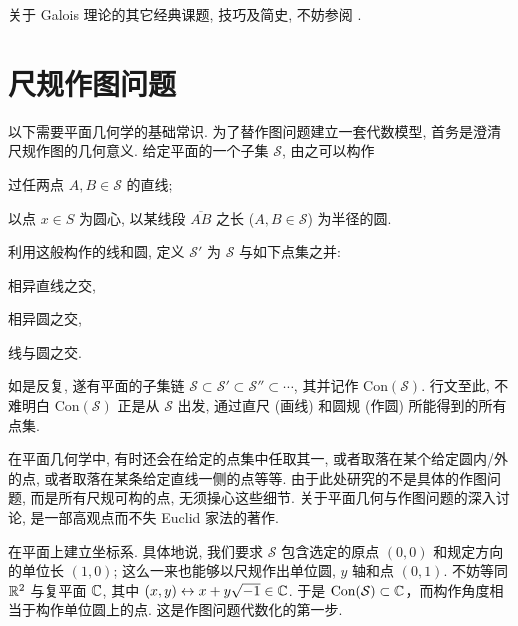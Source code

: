 关于 Galois 理论的其它经典课题, 技巧及简史, 不妨参阅 \cite{ZhP}.

\section{尺规作图问题}
以下需要平面几何学的基础常识. 为了替作图问题建立一套代数模型, 首务是澄清尺规作图的几何意义. 给定平面的一个子集 $\mathcal{S}$, 由之可以构作
\begin{compactitem}
	\item 过任两点 $A, B \in \mathcal{S}$ 的直线;
	\item 以点 $x \in S$ 为圆心, 以某线段 $\overline{AB}$ 之长 ($A,B \in \mathcal{S}$) 为半径的圆.
\end{compactitem}
利用这般构作的线和圆, 定义 $\mathcal{S}'$ 为 $\mathcal{S}$ 与如下点集之并:
\begin{compactitem}
	\item 相异直线之交,
	\item 相异圆之交,
	\item 线与圆之交.
\end{compactitem}
如是反复, 遂有平面的子集链 $\mathcal{S} \subset \mathcal{S}' \subset \mathcal{S}'' \subset \cdots$, 其并记作 $\text{Con}(\mathcal{S})$. 行文至此, 不难明白 $\text{Con}(\mathcal{S})$ 正是从 $\mathcal{S}$ 出发, 通过直尺 (画线) 和圆规 (作圆) 所能得到的所有点集. 

在平面几何学中, 有时还会在给定的点集中任取其一, 或者取落在某个给定圆内/外的点, 或者取落在某条给定直线一侧的点等等. 由于此处研究的不是具体的作图问题, 而是所有尺规可构的点, 无须操心这些细节. 关于平面几何与作图问题的深入讨论, \cite{Har00} 是一部高观点而不失 Euclid 家法的著作.

在平面上建立坐标系. 具体地说, 我们要求 $\mathcal{S}$ 包含选定的原点 $(0,0)$ 和规定方向的单位长 $(1,0)$; 这么一来也能够以尺规作出单位圆, $y$ 轴和点 $(0,1)$. 不妨等同 $\mathbb{R}^2$ 与复平面 $\mathbb{C}$, 其中 $(x,y) \leftrightarrow x + y\sqrt{-1} \in \mathbb{C}$. 于是 $\text{Con}(\mathcal{S}) \subset \mathbb{C}$，而构作角度相当于构作单位圆上的点. 这是作图问题代数化的第一步. 

